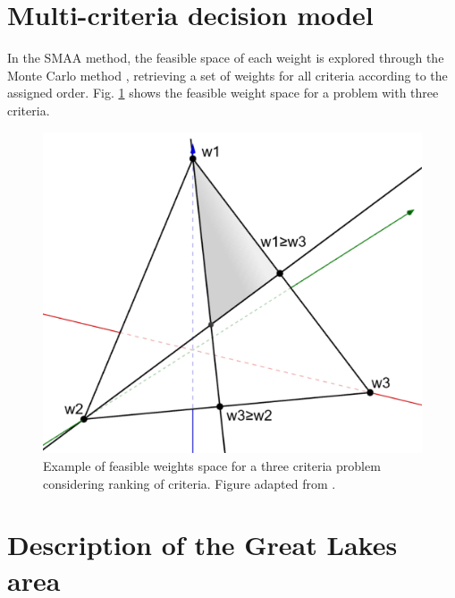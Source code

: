 \begin{refsection}[referencesCh4]
\section{Multi-criteria decision model}
In the SMAA method, the feasible space of each weight is explored through the Monte Carlo method \citep{tervonen_implementing_2007}, retrieving a set of weights for all criteria according to the assigned order. Fig. \ref{fig:SMAA_weights_AppC} shows the feasible weight space for a problem with three criteria. 
\begin{figure}[h!]
	\centering
	\includegraphics[width=0.4\linewidth, trim={2cm 6cm 8cm 2.5cm},clip]{gfx/AppendixC/SMAA.png} 
	\caption{Example of feasible weights space for a three criteria problem considering ranking of criteria. Figure adapted from \protect\citet{tervonen_implementing_2007}.}
	\label{fig:SMAA_weights_AppC}
\end{figure}

\newpage

\section{Description of the Great Lakes area}


\end{refsection}
